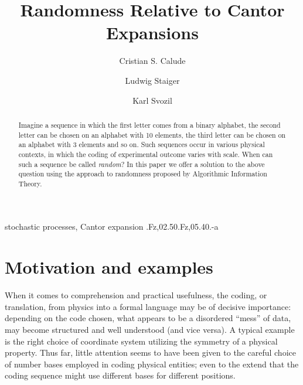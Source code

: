 \documentclass{elsart}
\begin{document}
\begin{frontmatter}

\title{Randomness Relative to Cantor Expansions}

\author{Cristian S. Calude}
\address{Department of Computer Science,
The University of Auckland,
Private Bag 92019,
Auckland, New Zealand
\\
email: cristian@cs.auckland.ac.nz}

\author{Ludwig Staiger}
\address{Martin-Luther-Universit\"at
Halle-Wittenberg, Institut f\"ur Informatik,
{D\,-\,06099} Halle,
Germany\\
email: staiger@informatik.uni-halle.de}

\author{Karl  Svozil}
\address{Institut f\"ur Theoretische Physik,
 University of Technology Vienna,
 Wiedner Hauptstra\ss e 8-10/136,
 A-1040 Vienna, Austria\\
email: svozil@tph.tuwien.ac.at}


\begin{abstract}
Imagine a sequence in which the first letter comes from a binary alphabet,
the second letter can be chosen on an alphabet with 10 elements, the
third letter  can be chosen on an alphabet with 3 elements and so on.
Such sequences occur in various physical contexts,
in which the coding of experimental outcome varies with scale.
When can such a sequence be called {\it random}? In this paper we offer
a solution to the above question using the approach to randomness proposed
by Algorithmic Information Theory.
\end{abstract}

\begin{keyword}
stochastic processes, Cantor expansion
.Fz,02.50.Fz,05.40.-a
\end{keyword}
\end{frontmatter}

\section{Motivation and examples}
When it comes to comprehension and practical
usefulness, the coding,  or translation, from physics into
a formal language may be of decisive importance:
depending on the code chosen, what appears to be
a disordered ``mess'' of data, may become structured and
well understood (and vice versa).
A typical example is the right choice of coordinate system utilizing the symmetry
of a physical property.
Thus far, little attention seems to have been given to
the careful choice of number bases employed in coding physical entities;
even to the extend that the coding sequence might use different bases
for different positions.
\end{document}
